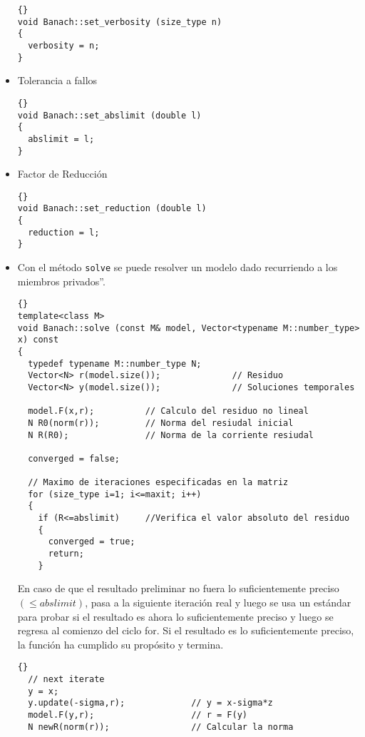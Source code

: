 \documentclass[a4paper,11pt]{article}
\theoremstyle{definition}
\begin{document}
\begin{itemize}
  {\footnotesize{\begin{lstlisting}{}
void Banach::set_verbosity (size_type n)
{
  verbosity = n;
}
\end{lstlisting}}}

\item Tolerancia a fallos
  {\footnotesize{\begin{lstlisting}{}
void Banach::set_abslimit (double l)
{
  abslimit = l;
}
\end{lstlisting}}}

\item Factor de Reducción 
  {\footnotesize{\begin{lstlisting}{}
void Banach::set_reduction (double l)
{
  reduction = l;
}
\end{lstlisting}}}

\item Con el método \lstinline{solve} se puede resolver un modelo dado recurriendo a los miembros privados''.

  {\footnotesize{\begin{lstlisting}{}
template<class M>
void Banach::solve (const M& model, Vector<typename M::number_type> x) const
{
  typedef typename M::number_type N;
  Vector<N> r(model.size());              // Residuo
  Vector<N> y(model.size());              // Soluciones temporales

  model.F(x,r);          // Calculo del residuo no lineal
  N R0(norm(r));         // Norma del resiudal inicial
  N R(R0);               // Norma de la corriente resiudal

  converged = false;

  // Maximo de iteraciones especificadas en la matriz 
  for (size_type i=1; i<=maxit; i++)
  {
    if (R<=abslimit)     //Verifica el valor absoluto del residuo
    {
      converged = true;
      return;
    }
  \end{lstlisting}}}

En caso de que el resultado preliminar no fuera lo suficientemente preciso $(\leqslant
abslimit)$, pasa a la siguiente iteración real y luego se usa un estándar para probar si
el resultado es ahora lo suficientemente preciso y luego se regresa al comienzo del ciclo 
for.  Si el resultado es lo suficientemente preciso, la función ha cumplido su propósito y termina.
{\footnotesize{\begin{lstlisting}{}
  // next iterate
  y = x;
  y.update(-sigma,r);             // y = x-sigma*z
  model.F(y,r);                   // r = F(y)
  N newR(norm(r));                // Calcular la norma


\end{lstlisting}}}
\end{itemize}
\end{document}
